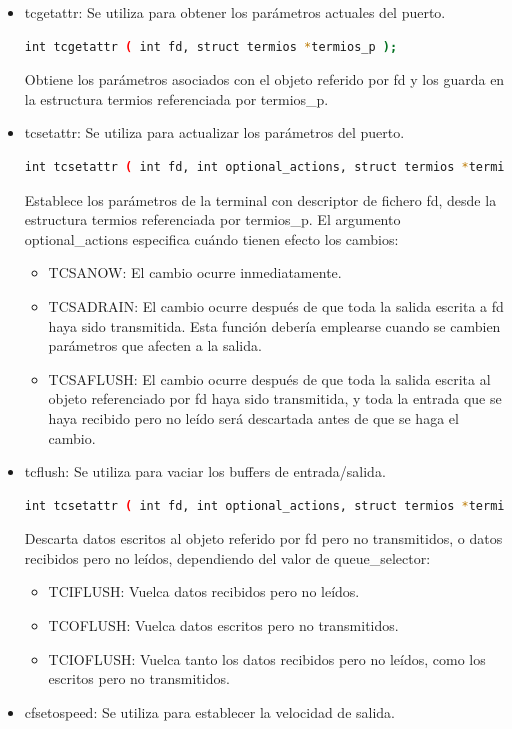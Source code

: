 \documentclass[12pt,twoside]{book}
\begin{document}
\begin{itemize}
\item tcgetattr: Se utiliza para obtener los parámetros actuales del puerto.
\begin{lstlisting}[language=bash]
int tcgetattr ( int fd, struct termios *termios_p );
\end{lstlisting}

Obtiene los parámetros asociados con el objeto referido por fd y los
guarda en la estructura termios referenciada por termios\_p.

\item tcsetattr: Se utiliza para actualizar los parámetros del puerto.

\begin{lstlisting}[language=bash]
int tcsetattr ( int fd, int optional_actions, struct termios *termios_p);
\end{lstlisting}

Establece los parámetros de la terminal con descriptor de fichero fd, desde
la estructura termios referenciada por termios\_p. El argumento
optional\_actions especifica cuándo tienen efecto los cambios:
\begin{itemize}
	\item TCSANOW: El cambio ocurre inmediatamente.
	\item TCSADRAIN: El cambio ocurre después de que toda la salida escrita a
fd haya sido transmitida. Esta función debería emplearse cuando se
cambien parámetros que afecten a la salida.
	\item TCSAFLUSH: El cambio ocurre después de que toda la salida escrita
al objeto referenciado por fd haya sido transmitida, y toda la entrada
que se haya recibido pero no leído será descartada antes de que se
haga el cambio.
\end{itemize}
\item tcflush: Se utiliza para vaciar los buffers de entrada/salida.

\begin{lstlisting}[language=bash]
int tcsetattr ( int fd, int optional_actions, struct termios *termios_p);
\end{lstlisting}

Descarta datos escritos al objeto referido por fd pero no transmitidos, o
datos recibidos pero no leídos, dependiendo del valor de queue\_selector:

\begin{itemize}
\item TCIFLUSH: Vuelca datos recibidos pero no leídos.
\item TCOFLUSH: Vuelca datos escritos pero no transmitidos.
\item TCIOFLUSH: Vuelca tanto los datos recibidos pero no leídos, como los
escritos pero no transmitidos.
\end{itemize}
\item cfsetospeed: Se utiliza para establecer la velocidad de salida.


\end{itemize}
\end{document}
